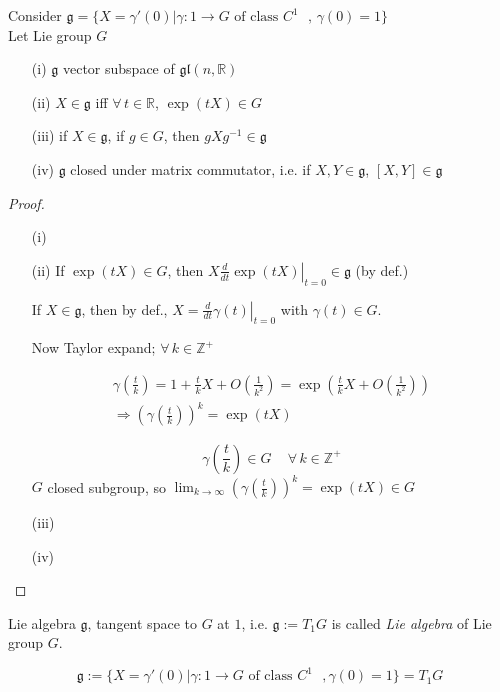 \begin{theorem}\label{dgdt:Thm:5.1YKos}
	Consider $\mathfrak{g} = \lbrace X = \gamma'(0) | \gamma : 1 \to G \text{ of class $C^1$ }, \, \gamma(0) = 1 \rbrace$ \\
	Let Lie group $G$
	\begin{enumerate}
		\item[(i)] $\mathfrak{g}$ vector subspace of $\mathfrak{gl}(n,\mathbb{R})$
		\item[(ii)] $X \in \mathfrak{g}$ iff $\forall \, t \in \mathbb{R}$, $\exp{(tX)} \in G$ 
		\item[(iii)] if $X \in \mathfrak{g}$, if $g\in G$, then $gXg^{-1} \in \mathfrak{g}$
		\item[(iv)] $\mathfrak{g}$ closed under matrix commutator, i.e. if $X,Y \in \mathfrak{g}$, $[X,Y] \in \mathfrak{g}$
	\end{enumerate}
\end{theorem}

\begin{proof}
	\begin{enumerate}
		\item[(i)]
		\item[(ii)] If $\exp{ (tX)} \in G$, then $X \left. \frac{d}{dt} \exp{(tX)} \right|_{t=0} \in \mathfrak{g}$ (by def.)
		
		If $X \in \mathfrak{g}$, then by def., $X = \left. \frac{d}{dt} \gamma(t) \right|_{t=0}$ with $\gamma(t) \in G$.  
		
		Now Taylor expand; $\forall \, k \in \mathbb{Z}^+$ 
		
		\[
		\begin{gathered}
		\gamma\left( \frac{t}{k} \right) = 1 + \frac{t}{k} X + O\left( \frac{1}{k^2} \right) = \exp{ \left( \frac{t}{k} X + O\left( \frac{1}{k^2} \right) \right) } \\
		\Longrightarrow \left( \gamma \left( \frac{t}{k} \right) \right)^k = \exp{ (tX)}
		\end{gathered}
		\]
		
		\[
		\gamma\left( \frac{t}{k} \right) \in G \quad \, \forall \, k \in \mathbb{Z}^+
		\]
		$G$ closed subgroup, so $\lim_{k \to \infty} (\gamma\left( \frac{t}{k} \right) )^k = \exp{(tX) } \in G$
		\item[(iii)]
		\item[(iv)]
	\end{enumerate}
\end{proof}

\begin{definition}
	Lie algebra $\mathfrak{g}$, tangent space to $G$ at $1$, i.e. $\mathfrak{g} := T_1 G$ is called \emph{Lie algebra} of Lie group $G$.  
	
	\[
	\mathfrak{g} := \lbrace X = \gamma'(0) | \gamma: 1 \to G \text{ of class $C^1$ }, \gamma(0) = 1 \rbrace = T_1G
	\]
\end{definition}

